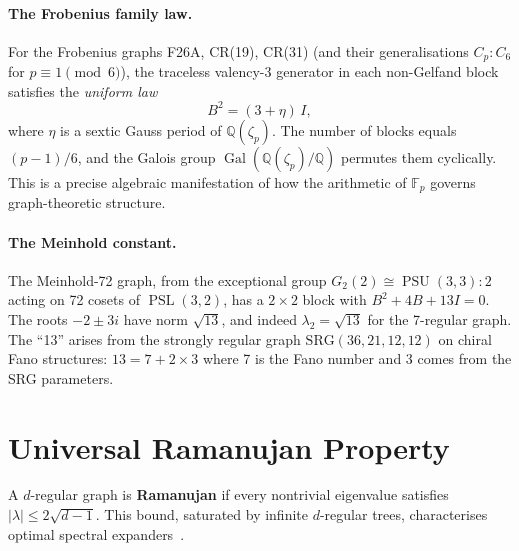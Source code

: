 \documentclass[mlmain]{jmlr}
\newcommand{\PSL}{\operatorname{PSL}}
\newcommand{\F}{\mathbb{F}}
\newcommand{\Q}{\mathbb{Q}}
\begin{document}
\paragraph{The Frobenius family law.}
For the Frobenius graphs F26A, CR(19), CR(31) (and their
generalisations $C_p{:}C_6$ for $p \equiv 1 \pmod{6}$),
the traceless valency-3 generator in each non-Gelfand block
satisfies the \emph{uniform law}
\begin{equation}
\label{eq:frobenius}
  B^2 = (3 + \eta)\,I,
\end{equation}
where $\eta$ is a sextic Gauss period of $\Q(\zeta_p)$.
The number of blocks equals $(p-1)/6$, and the Galois group
$\operatorname{Gal}(\Q(\zeta_p)/\Q)$ permutes them cyclically.
This is a precise algebraic manifestation of how the
arithmetic of $\F_p$ governs graph-theoretic structure.

\paragraph{The Meinhold constant.}
The Meinhold-72 graph, from the exceptional group
$G_2(2) \cong \operatorname{PSU}(3,3){:}2$ acting on 72
cosets of $\PSL(3,2)$, has a $2 \times 2$ block with
$B^2 + 4B + 13I = 0$.  The roots $-2 \pm 3i$ have norm
$\sqrt{13}$, and indeed $\lambda_2 = \sqrt{13}$ for the
7-regular graph.  The ``13'' arises from the strongly regular
graph $\mathrm{SRG}(36, 21, 12, 12)$ on chiral Fano
structures: $13 = 7 + 2 \times 3$ where 7 is the Fano
number and 3 comes from the SRG parameters.


\section{Universal Ramanujan Property}
\label{sec:ramanujan}

A $d$-regular graph is \textbf{Ramanujan} if every nontrivial
eigenvalue satisfies $|\lambda| \leq 2\sqrt{d-1}$.
This bound, saturated by infinite $d$-regular trees,
characterises optimal spectral
expanders~\citep{LPS1988, hoory2006}.
\end{document}
